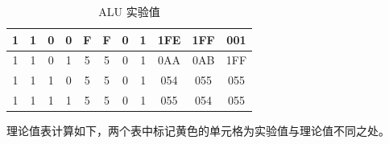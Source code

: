 \begin{enumerate}
\begin{table}[H]
\begin{tabular}{|c c c c|c c|c c|c|c|c|}
            \hline
            1 & 1 & 0 & 0 & F & F & 0 & 1 & 1FE & 1FF & 001 \\
            \hline
            1 & 1 & 0 & 1 & 5 & 5 & 0 & 1 & 0AA & 0AB & \cellcolor[HTML]{FFF9C4}1FF \\
            \hline
            1 & 1 & 1 & 0 & 5 & 5 & 0 & 1 & \cellcolor[HTML]{FFF9C4}054 & \cellcolor[HTML]{FFF9C4}055 & 055 \\
            \hline
            1 & 1 & 1 & 1 & 5 & 5 & 0 & 1 & 055 & 054 & 055 \\
            \hline
        \end{tabular}
        \caption{ALU 实验值}
        \label{tab:addi3_1}
    \end{table}
    
    理论值表计算如下，两个表中标记黄色的单元格为实验值与理论值不同之处。
    

\end{enumerate}
